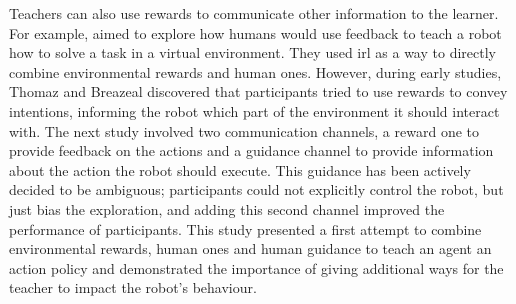 

Teachers can also use rewards to communicate other information to the learner. For example, \cite{thomaz2008teachable} aimed to explore how humans would use feedback to teach a robot how to solve a task in a virtual environment. They used \acrfull{irl} as a way to directly combine environmental rewards and human ones. However, during early studies, Thomaz and Breazeal discovered that participants tried to use rewards to convey intentions, informing the robot which part of the environment it should interact with. The next study involved two communication channels, a reward one to provide feedback on the actions and a guidance channel to provide information about the action the robot should execute. This guidance has been actively decided to be ambiguous; participants could not explicitly control the robot, but just bias the exploration, and adding this second channel improved the performance of participants. This study presented a first attempt to combine environmental rewards, human ones and human guidance to teach an agent an action policy and demonstrated the importance of giving additional ways for the teacher to impact the robot's behaviour.



